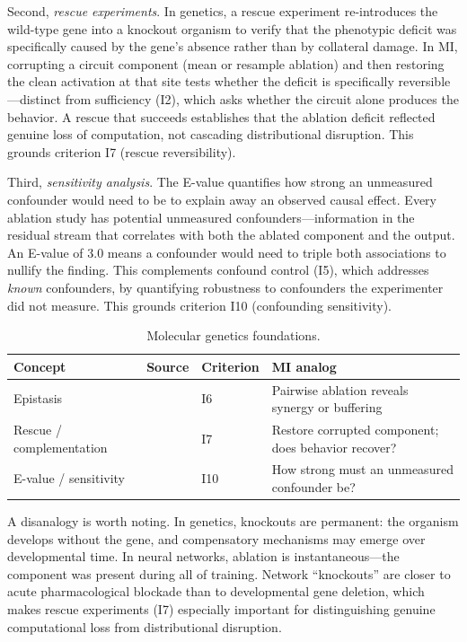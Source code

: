 \documentclass[10pt]{article}
\begin{document}
Second, \emph{rescue experiments}. In genetics, a rescue experiment re-introduces the wild-type gene into a knockout organism to verify that the phenotypic deficit was specifically caused by the gene's absence rather than by collateral damage. In MI, corrupting a circuit component (mean or resample ablation) and then restoring the clean activation at that site tests whether the deficit is specifically reversible---distinct from sufficiency (I2), which asks whether the circuit alone produces the behavior. A rescue that succeeds establishes that the ablation deficit reflected genuine loss of computation, not cascading distributional disruption. This grounds criterion I7 (rescue reversibility).

Third, \emph{sensitivity analysis}. The E-value quantifies how strong an unmeasured confounder would need to be to explain away an observed causal effect. Every ablation study has potential unmeasured confounders---information in the residual stream that correlates with both the ablated component and the output. An E-value of 3.0 means a confounder would need to triple both associations to nullify the finding. This complements confound control (I5), which addresses \emph{known} confounders, by quantifying robustness to confounders the experimenter did not measure. This grounds criterion I10 (confounding sensitivity).

\begin{table}[H]
\centering\small
\caption{Molecular genetics foundations.}
\renewcommand{\arraystretch}{1.12}
\begin{tabular}{@{}l>{\raggedright\arraybackslash}p{2.2cm}l>{\raggedright\arraybackslash}p{4.5cm}@{}}
\toprule
\textbf{Concept} & \textbf{Source} & \textbf{Criterion} & \textbf{MI analog} \\
\midrule
Epistasis & \citet{fisher1918correlation} & I6 & Pairwise ablation reveals synergy or buffering \\
\midrule
Rescue / complementation & \citet{brenner1974genetics} & I7 & Restore corrupted component; does behavior recover? \\
\midrule
E-value / sensitivity & \citet{vanderweele2017sensitivity} & I10 & How strong must an unmeasured confounder be? \\
\bottomrule
\end{tabular}
\end{table}

A disanalogy is worth noting. In genetics, knockouts are permanent: the organism develops without the gene, and compensatory mechanisms may emerge over developmental time. In neural networks, ablation is instantaneous---the component was present during all of training. Network ``knockouts'' are closer to acute pharmacological blockade than to developmental gene deletion, which makes rescue experiments (I7) especially important for distinguishing genuine computational loss from distributional disruption.
\end{document}
